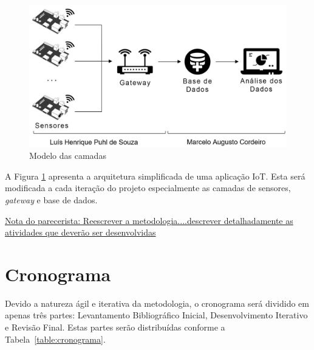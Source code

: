 \documentclass[
	12pt,				%
	openright,			%
	oneside,			%
	a4paper,			%
	chapter=TITLE,		%
	english,			%
	french,				%
	spanish,			%
	brazil				%
	]{abntex2}
\begin{document}
{\begin{figure}[htb]
	\caption{\label{fig:projeto}Modelo das camadas }
	\begin{center}
		\includegraphics[width=1\textwidth]{img/projeto.JPG}
	\end{center}
\end{figure}

A Figura \ref{fig:projeto} apresenta a arquitetura simplificada de uma aplicação IoT. Esta será modificada a cada iteração do projeto especialmente as camadas de sensores, \textit{gateway} e base de dados.

\underline{Nota do parecerista: Reescrever a metodologia....descrever detalhadamente as atividades que deverão ser desenvolvidas}





\chapter{Cronograma}


Devido a natureza ágil e iterativa da metodologia, o cronograma será dividido em apenas três partes: Levantamento Bibliográfico Inicial, Desenvolvimento Iterativo e Revisão Final. Estas partes serão distribuídas conforme a Tabela~\ref{table:cronograma}.

\begin{table}[htb]
\end{table}

}
\end{document}
